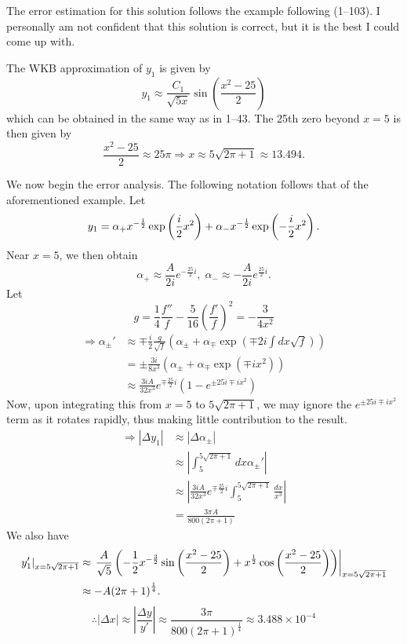 \item
The error estimation for this solution follows the example following  (1--103).
I personally am not confident that this solution is correct, but it is the best I could come up with.

The WKB approximation of $y_1$ is given by
\[
	y_1 \approx \frac{C_1}{\sqrt{5x}} \sin\left( \frac{x^2 - 25}{2} \right)
\]
which can be obtained in the same way as in  1--43.
The 25th zero beyond $x = 5$ is then given by
\[
	\frac{x^2 - 25}{2} \approx 25\pi
	\Rightarrow x \approx 5 \sqrt{2\pi + 1} \approx 13.494.
\]

We now begin the error analysis.
The following notation follows that of the aforementioned example.
Let
\[
	y_1 = \alpha_+ x^{-\frac{1}{2}} \exp\left( \frac{i}{2} x^2 \right) + \alpha_- x^{-\frac{1}{2}} \exp\left( -\frac{i}{2} x^2 \right).
\]
Near $x = 5$, we then obtain
\[
	\alpha_+ \approx \frac{A}{2i} e^{-\frac{25}{2}i},\; \alpha_- \approx -\frac{A}{2i} e^{\frac{25}{2}i}.
\]
Let
\[
	g = \frac{1}{4}\frac{f''}{f} - \frac{5}{16}{\left( \frac{f'}{f} \right)}^2
	= -\frac{3}{4x^2}
\]
\begin{align*}
	\Rightarrow \alpha_\pm'
	 & \approx \mp \frac{i}{2}\frac{g}{\sqrt{f}} \left( \alpha_\pm + \alpha_\mp \exp\left( \mp 2i \int dx \sqrt{f} \right) \right) \\
	 & = \pm \frac{3i}{8x^3} \left( \alpha_\pm + \alpha_\mp \exp\left( \mp ix^2 \right) \right)                                    \\
	 & \approx \frac{3iA}{32x^3} e^{\mp \frac{25}{2}i} \left( 1 - e^{\pm 25i \mp ix^2} \right)
\end{align*}
Now, upon integrating this from $x = 5$ to $5 \sqrt{2\pi + 1}$, we may ignore the $e^{\pm 25i \mp ix^2}$ term as it rotates rapidly, thus making little contribution to the result.
\begin{align*}
	\Rightarrow \left| \Delta y_1 \right|
	 & \approx \left| \Delta \alpha_\pm \right|                                                                 \\
	 & \approx \left| \int_5^{5 \sqrt{2\pi + 1}} dx \alpha_\pm' \right|                                         \\
	 & \approx \left| \frac{3iA}{32x^3} e^{\mp \frac{25}{2}i} \int_5^{5 \sqrt{2\pi + 1}} \frac{dx}{x^3} \right| \\
	 & = \frac{3\pi A}{800(2\pi + 1)}
\end{align*}
We also have
\begin{align*}
	\left. y_1' \right|_{x = 5 \sqrt{2\pi + 1}}
	 & \approx \left. \frac{A}{\sqrt{5}} \left( -\frac{1}{2} x^{-\frac{3}{2}} \sin\left( \frac{x^2 - 25}{2} \right) + x^{\frac{1}{2}} \cos\left( \frac{x^2 - 25}{2} \right) \right) \right|_{x = 5 \sqrt{2\pi + 1}} \\
	 & \approx - A {\left( 2\pi + 1 \right)}^{\frac{1}{4}}.
\end{align*}
\[
	\therefore \left| \Delta x \right|
	\approx \left| \frac{\Delta y}{y'} \right|
	\approx \frac{3\pi}{800 {\left( 2\pi + 1 \right)}^{\frac{1}{4}}}
	\approx 3.488 \times 10^{-4}
\]